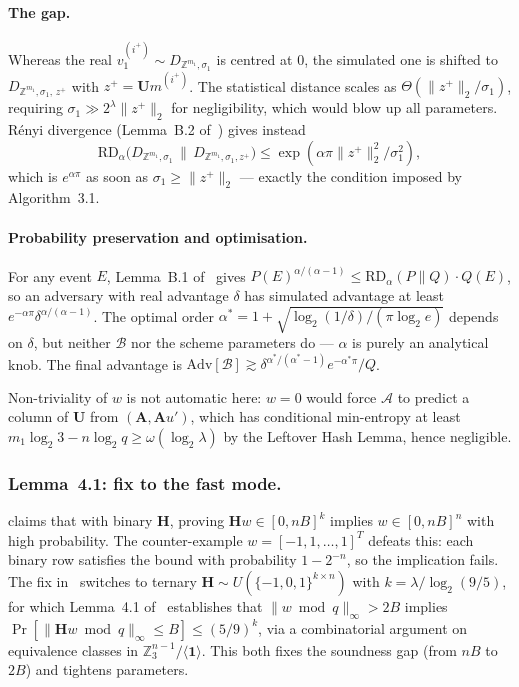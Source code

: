 \documentclass[a4paper]{article}
\begin{document}
\paragraph{The gap.} Whereas the real $v_1^{(i^+)}\sim D_{\mathbb{Z}^{m_1},\sigma_1}$
is centred at $0$, the simulated one is shifted to
$D_{\mathbb{Z}^{m_1},\sigma_1,\,z^+}$ with $z^+ = \mathbf{U}m^{(i^+)}$.
The statistical distance scales as $\Theta(\|z^+\|_2/\sigma_1)$, requiring
$\sigma_1 \gg 2^\lambda\|z^+\|_2$ for negligibility, which would blow up all
parameters. R\'enyi divergence (Lemma~B.2 of~\cite{mainPaper}) gives instead
\[
\mathrm{RD}_\alpha\bigl(D_{\mathbb{Z}^{m_1},\sigma_1}\,\big\|\,D_{\mathbb{Z}^{m_1},\sigma_1,z^+}\bigr)
\leq \exp(\alpha\pi\|z^+\|_2^2/\sigma_1^2),
\]
which is $e^{\alpha\pi}$ as soon as $\sigma_1\geq\|z^+\|_2$ — exactly the
condition imposed by Algorithm~3.1.

\paragraph{Probability preservation and optimisation.} For any event $E$,
Lemma~B.1 of~\cite{mainPaper} gives
$P(E)^{\alpha/(\alpha-1)} \leq \mathrm{RD}_\alpha(P\|Q)\cdot Q(E)$, so an
adversary with real advantage $\delta$ has simulated advantage at least
$e^{-\alpha\pi}\delta^{\alpha/(\alpha-1)}$. The optimal order
$\alpha^* = 1+\sqrt{\log_2(1/\delta)/(\pi\log_2 e)}$ depends on $\delta$, but
neither $\mathcal{B}$ nor the scheme parameters do — $\alpha$ is purely an
analytical knob. The final advantage is
$\mathrm{Adv}[\mathcal{B}]\gtrsim \delta^{\alpha^*/(\alpha^*-1)}e^{-\alpha^*\pi}/Q$.

Non-triviality of $w$ is not automatic here: $w=0$ would force $\mathcal{A}$ to
predict a column of $\mathbf{U}$ from $(\mathbf{A},\mathbf{A}u')$, which has
conditional min-entropy at least
$m_1\log_2 3 - n\log_2 q \geq \omega(\log_2\lambda)$ by the Leftover Hash
Lemma, hence negligible.

\subsubsection{Lemma~4.1: fix to the \cite{YangAZXYW19-0} fast mode.}
\cite{YangAZXYW19-0} claims that with binary $\mathbf{H}$, proving
$\mathbf{H}w\in[0,nB]^k$ implies $w\in[0,nB]^n$ with high probability. The counter-example
$w=[-1,1,\dots,1]^T$ defeats this: each binary row satisfies the bound with
probability $1-2^{-n}$, so the implication fails. The fix
in~\cite{mainPaper} switches to ternary $\mathbf{H}\sim U(\{-1,0,1\}^{k\times n})$
with $k=\lambda/\log_2(9/5)$, for which Lemma~4.1 of~\cite{mainPaper}
establishes that $\|w\bmod q\|_\infty>2B$ implies
$\Pr[\|\mathbf{H}w\bmod q\|_\infty\leq B]\leq (5/9)^k$, via a combinatorial
argument on equivalence classes in $\mathbb{Z}_3^{n-1}/\langle\mathbf{1}\rangle$.
This both fixes the soundness gap (from $nB$ to $2B$) and tightens parameters.
\end{document}
